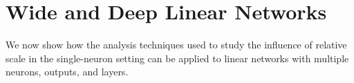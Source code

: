 \documentclass{article}
\theoremstyle{plain}
\theoremstyle{definition}
\theoremstyle{remark}
\begin{document}
%
%
%

\vspace{-5pt}
\section{Wide and Deep Linear Networks}
\label{sec:wide-deep-linear}
\vspace{-5pt}

We now show how the analysis techniques used to study the influence of relative scale in the single-neuron setting can be applied to linear networks with multiple neurons, outputs, and layers.
\end{document}
